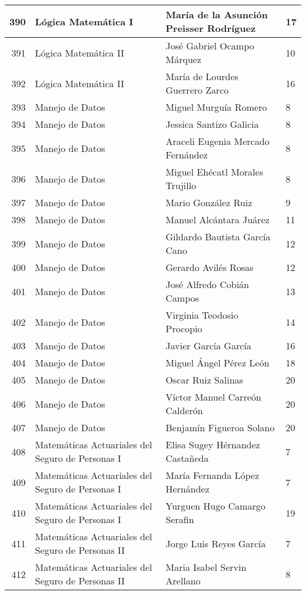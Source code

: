 \begin{table}[ht]
\begin{tabular}{rlll}
  390 & Lógica Matemática I & María de la Asunción Preisser Rodríguez & 17 \\ \hline
  391 & Lógica Matemática II & José Gabriel Ocampo Márquez & 10 \\ \hline
  392 & Lógica Matemática II & María de Lourdes Guerrero Zarco & 16 \\ \hline
  393 & Manejo de Datos & Miguel Murguía Romero & 8 \\ \hline
  394 & Manejo de Datos & Jessica Santizo Galicia & 8 \\ \hline
  395 & Manejo de Datos & Araceli Eugenia Mercado Fernández & 8 \\ \hline
  396 & Manejo de Datos & Miguel Ehécatl Morales Trujillo & 8 \\ \hline
  397 & Manejo de Datos & Mario González Ruiz & 9 \\ \hline
  398 & Manejo de Datos & Manuel Alcántara Juárez & 11 \\ \hline
  399 & Manejo de Datos & Gildardo Bautista García Cano & 12 \\ \hline
  400 & Manejo de Datos & Gerardo Avilés Rosas & 12 \\ \hline
  401 & Manejo de Datos & José Alfredo Cobián Campos & 13 \\ \hline
  402 & Manejo de Datos & Virginia Teodosio Procopio & 14 \\ \hline
  403 & Manejo de Datos & Javier García García & 16 \\ \hline
  404 & Manejo de Datos & Miguel Ángel Pérez León & 18 \\ \hline
  405 & Manejo de Datos & Oscar Ruiz Salinas & 20 \\ \hline
  406 & Manejo de Datos & Víctor Manuel Carreón Calderón & 20 \\ \hline
  407 & Manejo de Datos & Benjamín Figueroa Solano & 20 \\ \hline
  408 & Matemáticas Actuariales del Seguro de Personas I & Elisa Sugey Hérnandez Castañeda & 7 \\ \hline
  409 & Matemáticas Actuariales del Seguro de Personas I & María Fernanda López Hernández & 7 \\ \hline
  410 & Matemáticas Actuariales del Seguro de Personas I & Yurguen Hugo Camargo Serafin & 19 \\ \hline
  411 & Matemáticas Actuariales del Seguro de Personas II & Jorge Luis Reyes García & 7 \\ \hline
  412 & Matemáticas Actuariales del Seguro de Personas II & Maria Isabel Servin Arellano & 8 \\ \hline

\end{tabular}
\end{table}
